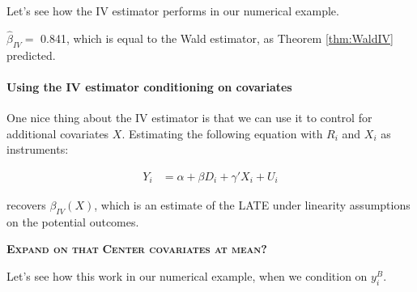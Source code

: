\documentclass[]{book}
\newenvironment{Shaded}{\begin{snugshade}}{\end{snugshade}}
\newcommand{\DecValTok}[1]{\textcolor[rgb]{0.00,0.00,0.81}{#1}}
\newcommand{\FloatTok}[1]{\textcolor[rgb]{0.00,0.00,0.81}{#1}}
\newcommand{\KeywordTok}[1]{\textcolor[rgb]{0.13,0.29,0.53}{\textbf{#1}}}
\newcommand{\NormalTok}[1]{#1}
\newcommand{\OperatorTok}[1]{\textcolor[rgb]{0.81,0.36,0.00}{\textbf{#1}}}
\newcommand{\StringTok}[1]{\textcolor[rgb]{0.31,0.60,0.02}{#1}}
\let\oldparagraph\paragraph
\renewcommand{\paragraph}[1]{\oldparagraph{#1}\mbox{}}
\theoremstyle{definition}
\theoremstyle{definition}
\theoremstyle{definition}
\theoremstyle{remark}
\let\BeginKnitrBlock\begin \let\EndKnitrBlock\end
\begin{document}
\BeginKnitrBlock{example}
\protect\hypertarget{exm:unnamed-chunk-124}{}{\label{exm:unnamed-chunk-124} }Let's see how the IV estimator performs in our numerical example.
\EndKnitrBlock{example}

\begin{Shaded}
\end{Shaded}

\(\hat{\beta}_{IV}=\) 0.841, which is equal to the Wald estimator, as Theorem \ref{thm:WaldIV} predicted.

\hypertarget{using-the-iv-estimator-conditioning-on-covariates}{%
\paragraph{Using the IV estimator conditioning on covariates}\label{using-the-iv-estimator-conditioning-on-covariates}}

One nice thing about the IV estimator is that we can use it to control for additional covariates \(X\).
Estimating the following equation with \(R_i\) and \(X_i\) as instruments:

\begin{align*}
    Y_i &  = \alpha +  \beta D_i + \gamma' X_i + U_i
  \end{align*}

recovers \(\beta_{IV}(X)\), which is an estimate of the LATE under linearity assumptions on the potential outcomes.

\textbf{\textsc{Expand on that}}
\textbf{\textsc{Center covariates at mean?}}

\BeginKnitrBlock{example}
\protect\hypertarget{exm:unnamed-chunk-125}{}{\label{exm:unnamed-chunk-125} }Let's see how this work in our numerical example, when we condition on \(y^B_i\).
\EndKnitrBlock{example}

\begin{Shaded}
\end{Shaded}
\end{document}
